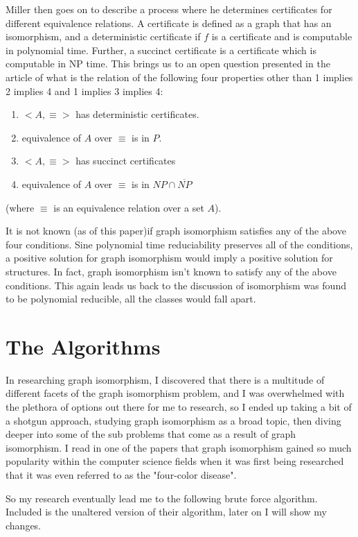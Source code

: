 \documentclass[notitlepage]{report}
\begin{document}
Miller then goes on to describe a process  where he determines certificates for different equivalence relations. A certificate is defined as a graph that has an isomorphism, and a deterministic certificate if $f$ is a certificate and is computable in polynomial time. Further, a succinct certificate is a certificate which is computable in NP time. This brings us to an open question presented in the article of what is the relation of the following four properties other than 1 implies 2 implies 4 and 1 implies 3 implies 4:

\begin{enumerate}
\item $<A,\equiv>$ has deterministic certificates.
\item equivalence of $A$ over $\equiv$ is in $P$.
\item $<A,\equiv>$ has succinct certificates
\item equivalence of $A$ over $\equiv$ is in $NP \cap \overline{NP}$
\end{enumerate}
(where $\equiv$ is an equivalence relation over a set $A$).

It is not known (as of this paper)if graph isomorphism satisfies any of the above four conditions. Sine polynomial time reduciability preserves all of the conditions, a positive solution for graph isomorphism would imply a positive solution for structures. In fact, graph isomorphism isn't known to satisfy any of the above conditions. This again leads us back to the discussion of isomorphism was found to be polynomial reducible, all the classes would fall apart.~\cite{miller}

\section*{The Algorithms}
In researching graph isomorphism, I discovered that there is a multitude of different facets of the graph isomorphism problem, and I was overwhelmed with the plethora of options out there for me to research, so I ended up taking a bit of a shotgun approach, studying graph isomorphism as a broad topic, then diving deeper into some of the sub problems that come as a result of graph isomorphism. I read in one of the papers that graph isomorphism gained so much popularity within the computer science fields when it was first being researched that it was even referred to as the "four-color disease".~\cite{read}

So my research eventually lead me to the following brute force algorithm. Included is the unaltered version of their algorithm, later on I will show my changes.
\end{document}
